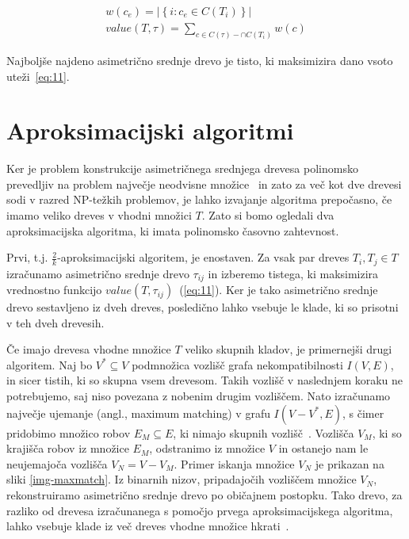 \documentclass[a4paper, 12pt]{book}
\begin{document}
\begin{align}
	w(c_e) = \left| \left\{ i: c_e \in C(T_i) \right\} \right| \label{eq:10} \\
	value(T, \tau) = \sum_{c \in C(\tau) - \cap C(T_i)} w(c) \label{eq:11}
\end{align}

\noindent Najboljše najdeno asimetrično srednje drevo je tisto, ki maksimizira dano vsoto 
uteži~\ref{eq:11}.

\section{Aproksimacijski algoritmi}
Ker je problem konstrukcije asimetričnega srednjega drevesa polinomsko prevedljiv 
na problem največje neodvisne množice~\cite{pw} in zato za več kot dve drevesi 
sodi v razred NP-težkih problemov, je lahko izvajanje algoritma prepočasno, če 
imamo veliko dreves v vhodni množici $T$. Zato si bomo ogledali dva 
aproksimacijska algoritma, ki imata polinomsko časovno zahtevnost.

Prvi, t.j. $\frac{2}{k}$-aproksimacijski algoritem, je enostaven. Za vsak par dreves 
$T_i, T_j \in T$ izračunamo asimetrično srednje drevo $\tau_{ij}$ in izberemo 
tistega, ki maksimizira vrednostno funkcijo $value(T, \tau_{ij})$~(\ref{eq:11}). Ker je tako 
asimetrično srednje drevo sestavljeno iz dveh dreves, posledično lahko vsebuje 
le klade, ki so prisotni v teh dveh drevesih.

Če imajo drevesa vhodne množice $T$ veliko skupnih kladov, je primernejši 
drugi algoritem. Naj bo $V^* \subseteq V$ podmnožica vozlišč grafa nekompatibilnosti 
$I(V, E)$, in sicer tistih, ki so skupna vsem drevesom. Takih vozlišč v naslednjem 
koraku ne potrebujemo, saj niso povezana z nobenim drugim vozliščem. Nato izračunamo 
največje ujemanje (angl., maximum matching) v grafu $I(V - V^*, E)$, s čimer pridobimo 
množico robov $E_{M} \subseteq E$, ki nimajo skupnih vozlišč~\cite{mgt}. 
Vozlišča $V_{M}$, ki so krajišča robov iz množice $E_{M}$, odstranimo iz množice $V$ 
in ostanejo nam le neujemajoča vozlišča $V_{N} = V - V_{M}$. Primer iskanja množice 
$V_N$ je prikazan na sliki \ref{img-maxmatch}. Iz binarnih nizov, pripadajočih 
vozliščem množice $V_{N}$, rekonstruiramo asimetrično srednje drevo po običajnem 
postopku. Tako drevo, za razliko od drevesa izračunanega s pomočjo prvega 
aproksimacijskega algoritma, lahko vsebuje klade iz več dreves vhodne 
množice hkrati~\cite{pw}. 
\end{document}
